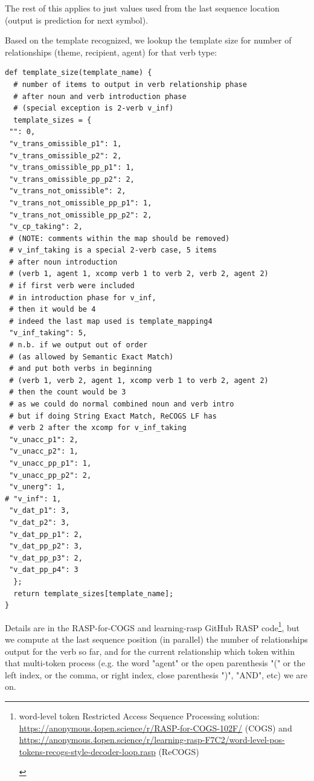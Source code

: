 \documentclass[11pt]{article}
\begin{document}
The rest of this applies to just values used from the last sequence location (output is prediction for next symbol).

Based on the template recognized, we lookup the template size for number of relationships (theme, recipient, agent) for that verb type:
\begin{tiny}
\begin{verbatim}
def template_size(template_name) {
  # number of items to output in verb relationship phase
  # after noun and verb introduction phase
  # (special exception is 2-verb v_inf)
  template_sizes = {
 "": 0,
 "v_trans_omissible_p1": 1,
 "v_trans_omissible_p2": 2,
 "v_trans_omissible_pp_p1": 1,
 "v_trans_omissible_pp_p2": 2,
 "v_trans_not_omissible": 2,
 "v_trans_not_omissible_pp_p1": 1,
 "v_trans_not_omissible_pp_p2": 2,
 "v_cp_taking": 2,
 # (NOTE: comments within the map should be removed)
 # v_inf_taking is a special 2-verb case, 5 items
 # after noun introduction
 # (verb 1, agent 1, xcomp verb 1 to verb 2, verb 2, agent 2)
 # if first verb were included 
 # in introduction phase for v_inf,
 # then it would be 4
 # indeed the last map used is template_mapping4
 "v_inf_taking": 5,
 # n.b. if we output out of order
 # (as allowed by Semantic Exact Match)
 # and put both verbs in beginning
 # (verb 1, verb 2, agent 1, xcomp verb 1 to verb 2, agent 2)
 # then the count would be 3
 # as we could do normal combined noun and verb intro
 # but if doing String Exact Match, ReCOGS LF has
 # verb 2 after the xcomp for v_inf_taking
 "v_unacc_p1": 2,
 "v_unacc_p2": 1,
 "v_unacc_pp_p1": 1,
 "v_unacc_pp_p2": 2,
 "v_unerg": 1,
# "v_inf": 1,
 "v_dat_p1": 3,
 "v_dat_p2": 3,
 "v_dat_pp_p1": 2,
 "v_dat_pp_p2": 3,
 "v_dat_pp_p3": 2,
 "v_dat_pp_p4": 3
  };
  return template_sizes[template_name];
}
\end{verbatim}
\end{tiny}

Details are in the RASP-for-COGS and learning-rasp GitHub RASP code\footnote{\begin{footnotesize}word-level token Restricted Access Sequence Processing solution: \href{https://anonymous.4open.science/r/RASP-for-COGS-102F/}{https://anonymous.4open.science/r/RASP-for-COGS-102F/} (COGS) and \href{https://anonymous.4open.science/r/learning-rasp-F7C2/word-level-pos-tokens-recogs-style-decoder-loop.rasp}{https://anonymous.4open.science/r/learning-rasp-F7C2/word-level-pos-tokens-recogs-style-decoder-loop.rasp} (ReCOGS) \end{footnotesize}}, but we compute at the last sequence position (in parallel) the number of relationships output for the verb so far, and for the current relationship which token within that multi-token process (e.g. the word "agent" or the open parenthesis "(" or the left index, or the comma, or right index, close parenthesis ")", "AND", etc) we are on.
\end{document}
